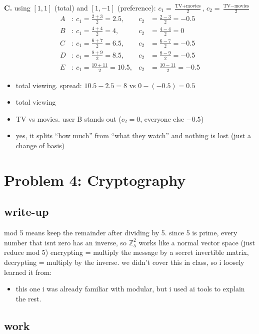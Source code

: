 \documentclass{article}
\begin{document}
\textbf{C.} using $[1,1]$ (total) and $[1,-1]$ (preference): $c_1 = \frac{\text{TV}+\text{movies}}{2}$, $c_2 = \frac{\text{TV}-\text{movies}}{2}$
\[
\begin{aligned}
A&:\ c_1 = \tfrac{2 + 3}{2} = 2.5, & c_2 &= \tfrac{2 - 3}{2} = -0.5 \\
B&:\ c_1 = \tfrac{4 + 4}{2} = 4, & c_2 &= \tfrac{4 - 4}{2} = 0 \\
C&:\ c_1 = \tfrac{6 + 7}{2} = 6.5, & c_2 &= \tfrac{6 - 7}{2} = -0.5 \\
D&:\ c_1 = \tfrac{8 + 9}{2} = 8.5, & c_2 &= \tfrac{8 - 9}{2} = -0.5 \\
E&:\ c_1 = \tfrac{10 + 11}{2} = 10.5, & c_2 &= \tfrac{10 - 11}{2} = -0.5
\end{aligned}
\]
\begin{itemize}
  \item[i.] total viewing. spread: $10.5 - 2.5 = 8$ vs $0 - (-0.5) = 0.5$
  \item[ii.] total viewing
  \item[iii.] TV vs movies. user B stands out ($c_2 = 0$, everyone else $-0.5$)
  \item[iv.] yes, it splits ``how much'' from ``what they watch'' and nothing is lost (just a change of basis)
\end{itemize}

\section*{Problem 4: Cryptography}

\subsection*{write-up}

mod 5 means keep the remainder after dividing by 5. since 5 is prime, every number that isnt zero has an inverse,
so $\mathbb{Z}_5^2$ works like a normal vector space (just reduce mod 5)
encrypting = multiply the message by a secret invertible matrix, decrypting = multiply by the inverse.
we didn't cover this in class, so i loosely learned it from:

\begin{itemize}
  \item this one i was already familiar with modular, but i used ai tools to explain the rest.
\end{itemize}

\subsection*{work}
\end{document}
